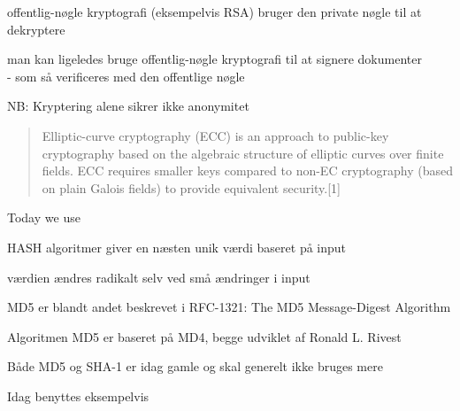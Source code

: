 \documentclass[Screen16to9,17pt]{foils}
\begin{document}


\begin{list1}
\item offentlig-nøgle kryptografi (eksempelvis RSA) bruger den private
  nøgle til at dekryptere
\item man kan ligeledes bruge offentlig-nøgle kryptografi til at
  signere dokumenter\\ - som så verificeres med den offentlige nøgle
\item NB: Kryptering alene sikrer ikke anonymitet
\end{list1}


\begin{quote}
Elliptic-curve cryptography (ECC) is an approach to public-key cryptography based on the algebraic structure of elliptic curves over finite fields. ECC requires smaller keys compared to non-EC cryptography (based on plain Galois fields) to provide equivalent security.[1]
\end{quote}

\begin{list2}
\item Today we use 
\end{list2}






\begin{list1}
\item HASH algoritmer giver en næsten unik værdi baseret på input

\item værdien ændres radikalt selv ved små ændringer i input
\item MD5 er blandt andet beskrevet i RFC-1321: The MD5 Message-Digest
  Algorithm
\item Algoritmen MD5 er baseret på MD4, begge udviklet af Ronald
  L. Rivest
\item Både MD5 og SHA-1 er idag gamle og skal generelt ikke bruges mere
\item Idag benyttes eksempelvis 
\end{list1}
\end{document}
